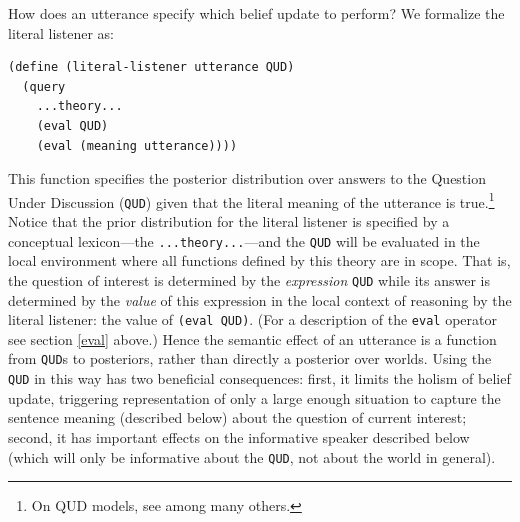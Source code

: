 \documentclass[pdfextras]{handbook}
\begin{document}
How does an utterance specify which belief update to perform? We formalize the literal listener as:
\begin{lstlisting}
(define (literal-listener utterance QUD)
  (query
    ...theory...
    (eval QUD)
    (eval (meaning utterance))))
\end{lstlisting}
This function specifies the posterior distribution over answers to the Question Under Discussion (\lstinline{QUD}) given that the literal meaning of the utterance is true.\footnote{On QUD models, see \citealt{ginzburg95a,vankuppevelt95,roberts96,beaverclark08} among many others.} 
Notice that the prior distribution for the literal listener is specified by a conceptual lexicon---the \lstinline{...theory...}---and the \lstinline{QUD} will be evaluated in the local environment where all functions defined by this theory are in scope. That is, the question of interest is determined by the \emph{expression} \lstinline{QUD} while its answer is determined by the \emph{value} of this expression in the local context of reasoning by the literal listener: the value of \lstinline{(eval QUD)}. (For a description of the \lstinline{eval} operator see section \ref{eval} above.)
Hence the semantic effect of an utterance is a function from \lstinline{QUD}s to posteriors, rather than directly a posterior over worlds. Using the \lstinline{QUD} in this way has two beneficial consequences: first, it limits the holism of belief update, triggering representation of only a large enough situation to capture the sentence meaning (described below) about the question of current interest; second, it has important effects on the informative speaker described below (which will only be informative about the \lstinline{QUD}, not about the world in general).
\end{document}

